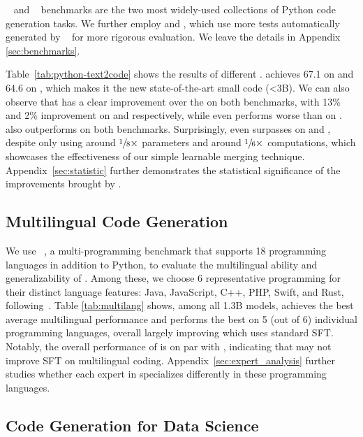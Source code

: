 \humaneval~\cite{chen2021evaluating} and \mbpp~\cite{austin2021program} benchmarks are the two most widely-used collections of Python code generation tasks. 
We further employ \humanevalp and \mbppp, which use more tests automatically generated by \evalplus~\cite{evalplus} for more rigorous evaluation. 
We leave the details in Appendix \ref{sec:benchmarks}.

Table~\ref{tab:python-text2code} shows the  results of different .
\ours achieves 67.1  on \humaneval and 64.6  on \humanevalp, which makes it the new state-of-the-art small code \llm{} (<3B). 
We can also observe that \oursmerge has a clear improvement over the \baselineds on both benchmarks, with 13\% and 2\% improvement on \humanevalp and \mbppp respectively, while \ewads even performs worse than \baselineds on \mbpp{(+)}.
\oursmerge also outperforms \ewads on both benchmarks. 
Surprisingly, \oursmerge even surpasses \oursmoe on \humaneval and \humanevalp, despite only using around $\sfrac{1}{8}\times$ parameters and around $\sfrac{1}{6}\times$ computations, which showcases the effectiveness of our simple learnable merging technique. Appendix~\ref{sec:statistic} further demonstrates the statistical significance of the improvements brought by \ours.

\subsection{Multilingual Code Generation}\label{sec:multiple}

We use \multiple~\cite{cassano2022multiple}, a multi-programming benchmark that supports 18 programming languages in addition to Python, to evaluate the multilingual ability and generalizability of \ours{}. 
Among these, we choose 6 representative programming for their distinct language features: Java, JavaScript, C++, PHP, Swift, and Rust, following~\citet{wei2023magicoder}.
Table \ref{tab:multilang} shows, among all 1.3B models, \oursmerge achieves the best average multilingual performance and performs the best on 5 (out of 6) individual programming languages, 
overall largely improving \baselineds{} which uses standard SFT.
Notably, the overall performance of \ewads is on par with \baselineds, indicating that \ewads{} may not improve SFT on multilingual coding.
Appendix~\ref{sec:expert_analysis} further studies whether each expert in \oursmoe specializes differently in these programming languages.

\subsection{Code Generation for Data Science}

